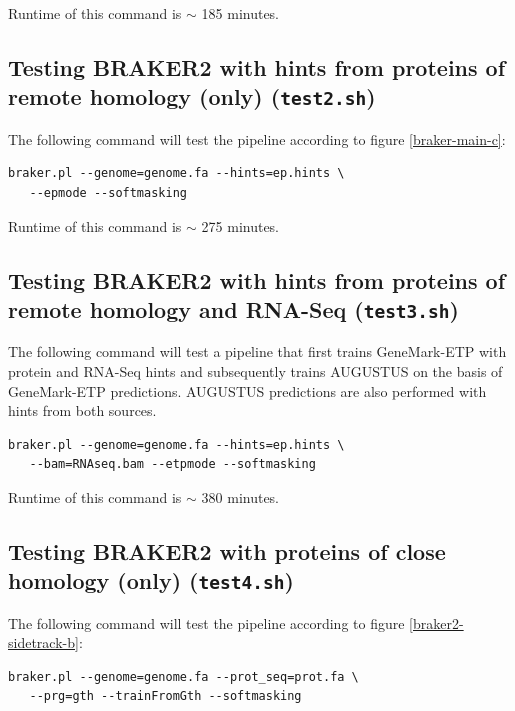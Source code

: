 \documentclass[]{article}
\begin{document}
Runtime of this command is \(\sim\) 185 minutes.

\subsection{Testing BRAKER2 with hints from proteins of remote homology (only)
(\texttt{test2.sh})}\label{testing-braker2-with-hints-from-proteins-of-remote-homology-only-test2.sh}

The following command will test the pipeline according to figure
\ref{braker-main-c}:

\begin{verbatim}
braker.pl --genome=genome.fa --hints=ep.hints \
   --epmode --softmasking
\end{verbatim}

Runtime of this command is \(\sim\) 275 minutes.

\subsection{Testing BRAKER2 with hints from proteins of remote homology and RNA-Seq
(\texttt{test3.sh})}\label{testing-braker2-with-hints-from-proteins-of-remote-homology-and-rna-seq-test3.sh}

The following command will test a pipeline that first trains
GeneMark-ETP with protein and RNA-Seq hints and subsequently trains
AUGUSTUS on the basis of GeneMark-ETP predictions. AUGUSTUS predictions
are also performed with hints from both sources.

\begin{verbatim}
braker.pl --genome=genome.fa --hints=ep.hints \
   --bam=RNAseq.bam --etpmode --softmasking
\end{verbatim}

Runtime of this command is \(\sim\) 380 minutes.

\subsection{Testing BRAKER2 with proteins of close homology (only)
(\texttt{test4.sh})}\label{testing-braker2-with-proteins-of-close-homology-only-test4.sh}

The following command will test the pipeline according to figure
\ref{braker2-sidetrack-b}:

\begin{verbatim}
braker.pl --genome=genome.fa --prot_seq=prot.fa \
   --prg=gth --trainFromGth --softmasking
\end{verbatim}
\end{document}
